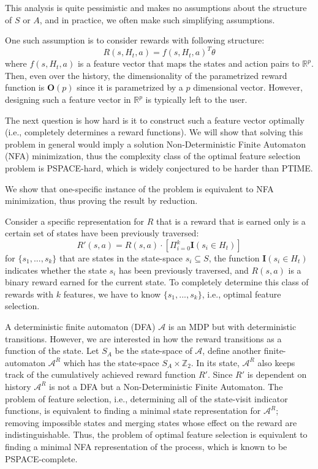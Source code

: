 This analysis is quite pessimistic and makes no assumptions about the structure of $S$ or $A$, and in practice, we often make such simplifying assumptions.


One such assumption is to consider rewards with following structure:
\[
R(s,H_t,a) =  f(s,H_t,a)^T \theta
\]
where $f(s,H_t,a)$ is a feature vector that maps the states and action pairs to $\mathbb{R}^p$.
Then, even over the history, the dimensionality of the parametrized reward function is $\mathbf{O}(p)$ since it is parametrized by a $p$ dimensional vector.
However, designing such a feature vector in $\mathbb{R}^p$ is typically left to the user.

The next question is how hard is it to construct such a feature vector optimally (i.e., completely determines a reward functions).
We will show that solving this problem in general would imply a solution Non-Deterministic Finite Automaton (NFA) minimization, thus the complexity class of the optimal feature selection problem is PSPACE-hard, which is widely conjectured to be harder than PTIME.

\vspace{0.5em}



\vspace{0.5em}

We show that one-specific instance of the problem is equivalent to NFA minimization, thus proving the result by reduction.



Consider a specific representation for $R$ that is a reward that is earned only is a certain set of states have been previously traversed:
\[
R'(s,a) = R(s,a) \cdot [\Pi_{i=0}^k \mathbf{I}(s_{i} \in H_t)]
\]
for $\{s_1,...,s_k\}$ that are states in the state-space $s_i \subseteq S$, the function $\mathbf{I}(s_{i} \in H_t)$ indicates whether the state $s_i$ has been previously traversed, and $R(s,a)$ is a binary reward earned for the current state.
To completely determine this class of rewards with $k$ features, we have to know $\{s_1,...,s_k\}$, i.e., optimal feature selection.

A deterministic finite automaton (DFA) $\mathcal{A}$ is an MDP but with deterministic transitions.
However, we are interested in how the reward transitions as a function of the state.
Let $S_A$ be the state-space of $\mathcal{A}$, define another finite-automaton $\mathcal{A}^R$ which has the state-space $S_A \times \mathbb{Z}_2$.
In its state, $\mathcal{A}^R$ also keeps track of the cumulatively achieved reward function $R'$. 
Since $R'$ is dependent on history  $\mathcal{A}^R$ is not a DFA but a Non-Deterministic Finite Automaton.
The problem of feature selection, i.e., determining all of the state-visit indicator functions, is equivalent to finding a minimal state representation for $\mathcal{A}^R$; removing impossible states and merging states whose effect on the reward are indistinguishable.
Thus, the problem of optimal feature selection is equivalent to finding a minimal NFA representation of the process, which is known to be PSPACE-complete.

